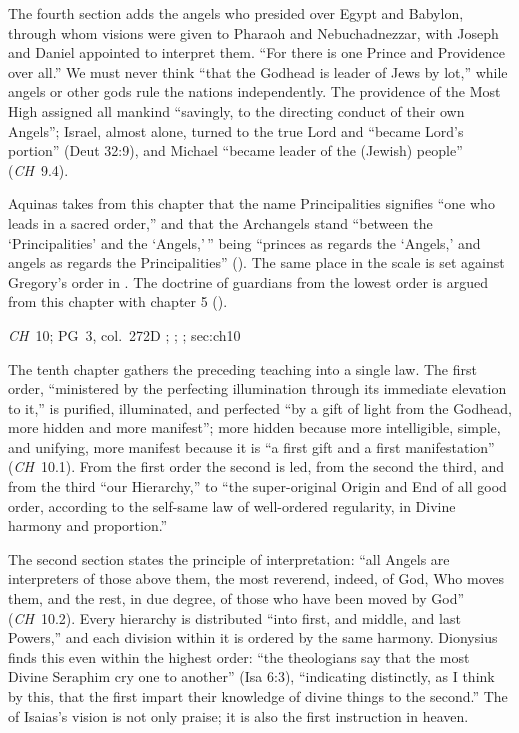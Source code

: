 The fourth section adds the angels who presided over Egypt and Babylon,
through whom visions were given to Pharaoh and Nebuchadnezzar, with
Joseph and Daniel appointed to interpret them. ``For there is one Prince
and Providence over all.'' We must never think ``that the Godhead is
leader of Jews by lot,'' while angels or other gods rule the nations
independently. The providence of the Most High assigned all mankind
``savingly, to the directing conduct of their own Angels''; Israel,
almost alone, turned to the true Lord and ``became Lord's portion''
(Deut 32:9), and Michael ``became leader of the (Jewish) people''
(\emph{CH}~9.4).

Aquinas takes from this chapter that the name Principalities signifies
``one who leads in a sacred order,'' and that the Archangels stand
``between the `Principalities' and the `Angels,'\,'' being ``princes as
regards the `Angels,' and angels as regards the Principalities'' (). The same place in the scale is set against
Gregory's order in . The doctrine of guardians
from the lowest order is argued from this chapter with chapter 5 ().

{\emph{CH}~10; PG~3, col.~272D}
{; ; ; }{sec:ch10}

The tenth chapter gathers the preceding teaching into a single law. The
first order, ``ministered by the perfecting illumination through its
immediate elevation to it,'' is purified, illuminated, and perfected ``by
a gift of light from the Godhead, more hidden and more manifest''; more
hidden because more intelligible, simple, and unifying, more manifest
because it is ``a first gift and a first manifestation'' (\emph{CH}~10.1). From the first order the second is led, from the second the third,
and from the third ``our Hierarchy,'' to ``the super-original Origin and
End of all good order, according to the self-same law of well-ordered
regularity, in Divine harmony and proportion.''

The second section states the principle of interpretation: ``all Angels
are interpreters of those above them, the most reverend, indeed, of God,
Who moves them, and the rest, in due degree, of those who have been moved
by God'' (\emph{CH}~10.2). Every hierarchy is distributed ``into first,
and middle, and last Powers,'' and each division within it is ordered by
the same harmony. Dionysius finds this even within the highest order:
``the theologians say that the most Divine Seraphim cry one to another''
(Isa 6:3), ``indicating distinctly, as I think by this, that the first
impart their knowledge of divine things to the second.'' The
 of Isaias's vision is not only praise; it is also the
first instruction in heaven.


